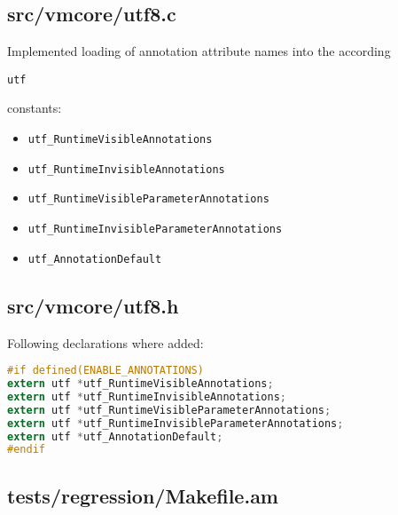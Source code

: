\documentclass[a4paper, 10pt, titlepage]{scrartcl} %
\begin{document}
\subsection{src/vmcore/utf8.c}
\label{sec:src/vmcore/utf8.c}

Implemented loading of annotation attribute names into the according \begin{scriptsize}\verb|utf|\end{scriptsize}
constants:
\begin{itemize}
 \item \begin{scriptsize}\verb|utf_RuntimeVisibleAnnotations|\end{scriptsize}
 \item \begin{scriptsize}\verb|utf_RuntimeInvisibleAnnotations|\end{scriptsize}
 \item \begin{scriptsize}\verb|utf_RuntimeVisibleParameterAnnotations|\end{scriptsize}
 \item \begin{scriptsize}\verb|utf_RuntimeInvisibleParameterAnnotations|\end{scriptsize}
 \item \begin{scriptsize}\verb|utf_AnnotationDefault|\end{scriptsize}
\end{itemize}

\subsection{src/vmcore/utf8.h}
\label{sec:src/vmcore/utf8.h}

Following declarations where added:
\begin{lstlisting}[language=C,firstnumber=151]
#if defined(ENABLE_ANNOTATIONS)
extern utf *utf_RuntimeVisibleAnnotations;
extern utf *utf_RuntimeInvisibleAnnotations;
extern utf *utf_RuntimeVisibleParameterAnnotations;
extern utf *utf_RuntimeInvisibleParameterAnnotations;
extern utf *utf_AnnotationDefault;
#endif
\end{lstlisting}

\subsection{tests/regression/Makefile.am}
\label{sec:tests/regression/Makefile.am}
\end{document}
